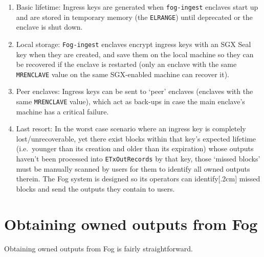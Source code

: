 \begin{enumerate}
    \item Basic lifetime: Ingress keys are generated when {\tt fog-ingest} enclaves start up and are stored in temporary memory (the {\tt ELRANGE}) until deprecated or the enclave is shut down.

    \item Local storage: {\tt Fog-ingest} enclaves encrypt ingress keys with an SGX Seal key when they are created, and save them on the local machine so they can be recovered if the enclave is restarted (only an enclave with the same {\tt MRENCLAVE} value on the same SGX-enabled machine can recover it).

    \item Peer enclaves: Ingress keys can be sent to `peer' enclaves (enclaves with the same {\tt MRENCLAVE} value), which act as back-ups in case the main enclave's machine has a critical failure.

    \item Last resort: In the worst case scenario where an ingress key is completely lost/unrecoverable, yet there exist blocks within that key's expected lifetime (i.e.\ younger than its creation and older than its expiration) whose outputs haven't been processed into {\tt ETxOutRecords} by that key, those `missed blocks' must be manually scanned by users for them to identify all owned outputs therein. The Fog system is designed so its operators can identify[.2cm] missed blocks and send the outputs they contain to users.
\end{enumerate}



\section{Obtaining owned outputs from Fog}
\label{sec:fog-obtaining-outputs}

Obtaining owned outputs from Fog is fairly straightforward.


